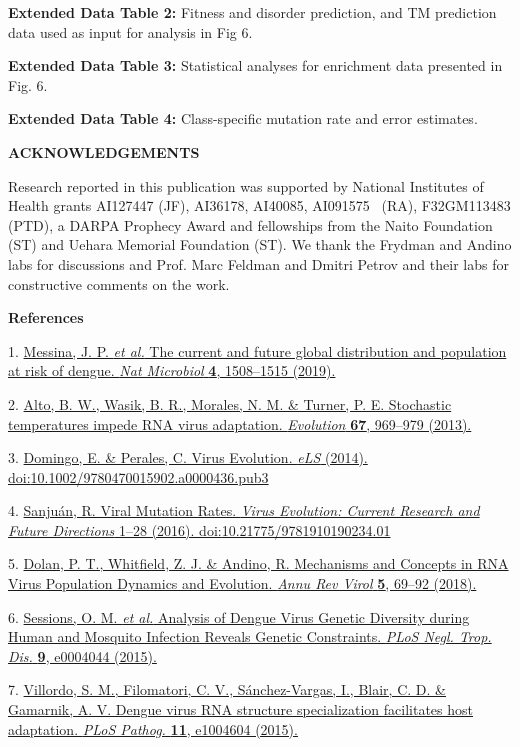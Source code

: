 \documentclass[
]{article}
\begin{document}
\textbf{Extended Data Table 2:} Fitness and disorder prediction, and TM
prediction data used as input for analysis in Fig 6.

\textbf{Extended Data Table 3:} Statistical analyses for enrichment data
presented in Fig. 6.

\textbf{Extended Data Table 4:} Class-specific mutation rate and error
estimates.

\textbf{ACKNOWLEDGEMENTS}

Research reported in this publication was supported by National
Institutes of Health grants AI127447 (JF), AI36178, AI40085, AI091575~
(RA), F32GM113483 (PTD), a DARPA Prophecy Award and fellowships from the
Naito Foundation (ST) and Uehara Memorial Foundation (ST). We thank the
Frydman and Andino labs for discussions and Prof. Marc Feldman and
Dmitri Petrov and their labs for constructive comments on the work.

\textbf{References}

1. \href{http://paperpile.com/b/REZjPf/Nx7yi}{Messina, J. P. \emph{et
al.} The current and future global distribution and population at risk
of dengue. \emph{Nat Microbiol} \textbf{4}, 1508--1515 (2019).}

2. \href{http://paperpile.com/b/REZjPf/9TgsM}{Alto, B. W., Wasik, B. R.,
Morales, N. M. \& Turner, P. E. Stochastic temperatures impede RNA virus
adaptation. \emph{Evolution} \textbf{67}, 969--979 (2013).}

3. \href{http://paperpile.com/b/REZjPf/8nuz1}{Domingo, E. \& Perales, C.
Virus Evolution. \emph{eLS} (2014).
doi:}\href{http://dx.doi.org/10.1002/9780470015902.a0000436.pub3}{10.1002/9780470015902.a0000436.pub3}

4. \href{http://paperpile.com/b/REZjPf/tRYDR}{Sanjuán, R. Viral Mutation
Rates. \emph{Virus Evolution: Current Research and Future Directions}
1--28 (2016).
doi:}\href{http://dx.doi.org/10.21775/9781910190234.01}{10.21775/9781910190234.01}

5. \href{http://paperpile.com/b/REZjPf/L1Afo}{Dolan, P. T., Whitfield,
Z. J. \& Andino, R. Mechanisms and Concepts in RNA Virus Population
Dynamics and Evolution. \emph{Annu Rev Virol} \textbf{5}, 69--92
(2018).}

6. \href{http://paperpile.com/b/REZjPf/mlDyr}{Sessions, O. M. \emph{et
al.} Analysis of Dengue Virus Genetic Diversity during Human and
Mosquito Infection Reveals Genetic Constraints. \emph{PLoS Negl. Trop.
Dis.} \textbf{9}, e0004044 (2015).}

7. \href{http://paperpile.com/b/REZjPf/r0H6}{Villordo, S. M.,
Filomatori, C. V., Sánchez-Vargas, I., Blair, C. D. \& Gamarnik, A. V.
Dengue virus RNA structure specialization facilitates host adaptation.
\emph{PLoS Pathog.} \textbf{11}, e1004604 (2015).}
\end{document}
